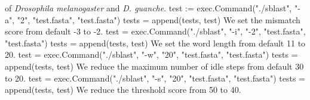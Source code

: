 of \emph{Drosophila melanogaster} and \emph{D. guanche}.
\nwenddocs{}\endmoddef\nwstartdeflinemarkup{}\nwenddeflinemarkup
test := exec.Command("./sblast", "-a", "2",
          "test.fasta", "test.fasta")
tests = append(tests, test)
\nwendcode{}\nwdocspar
We set the mismatch score from default -3 to -2.
\nwenddocs{}\endmoddef\nwstartdeflinemarkup{}\nwenddeflinemarkup
test = exec.Command("./sblast", "-i", "-2",
          "test.fasta", "test.fasta")
tests = append(tests, test)
\nwendcode{}\nwdocspar
We set the word length from default 11 to 20.
\nwenddocs{}\endmoddef\nwstartdeflinemarkup{}\nwenddeflinemarkup
test = exec.Command("./sblast", "-w", "20",
          "test.fasta", "test.fasta")
tests = append(tests, test)
\nwendcode{}\nwdocspar
We reduce the maximum number of idle steps from default 30 to 20.
\nwenddocs{}\endmoddef\nwstartdeflinemarkup{}\nwenddeflinemarkup
test = exec.Command("./sblast", "-s", "20",
          "test.fasta", "test.fasta")
tests = append(tests, test)
\nwendcode{}\nwdocspar
We reduce the threshold score from 50 to 40.
\nwenddocs{}\endmoddef\nwstartdeflinemarkup{}\nwenddeflinemarkup
